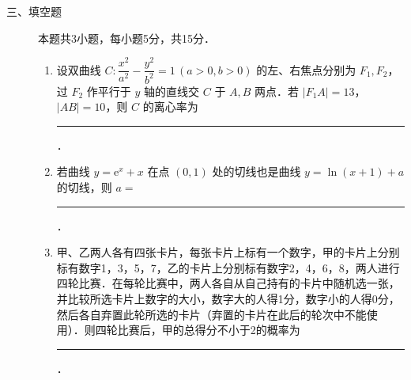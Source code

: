 \begin{description}
    \item[三、填空题] 本题共3小题，每小题5分，共15分．
    \begin{enumerate}[leftmargin=5pt]
      \addtocounter{enumi}{+11}
        \item 设双曲线 $C:\dfrac{x^2}{a^2}-\dfrac{y^2}{b^2}=1\,(a>0,b>0)$ 的左、右焦点分别为 $F_1,F_2$，过 $F_2$ 作平行于 $y$ 轴的直线交 $C$ 于 $A,B$ 两点．若 $|F_1A|=13$，$|AB|=10$，则 $C$ 的离心率为 \rule[-0.3ex]{3em}{0.4pt}．
        \item 若曲线 $y=\mathrm{e}^x+x$ 在点 $(0,1)$ 处的切线也是曲线 $y=\ln(x+1)+a$ 的切线，则 $a=$ \rule[-0.3ex]{3em}{0.4pt}．
        \item 甲、乙两人各有四张卡片，每张卡片上标有一个数字，甲的卡片上分别标有数字1，3，5，7，乙的卡片上分别标有数字2，4，6，8，两人进行四轮比赛．在每轮比赛中，两人各自从自己持有的卡片中随机选一张，并比较所选卡片上数字的大小，数字大的人得1分，数字小的人得0分，然后各自弃置此轮所选的卡片（弃置的卡片在此后的轮次中不能使用）．则四轮比赛后，甲的总得分不小于2的概率为 \rule[-0.3ex]{3em}{0.4pt}．
    \end{enumerate}
\end{description}

